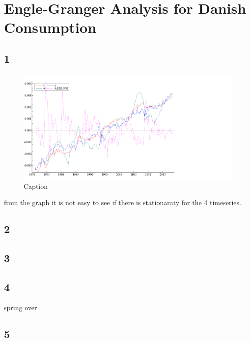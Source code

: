 \documentclass[12pt]{article}
\begin{document}
{\selectfont


\section{Engle-Granger Analysis for Danish Consumption}


\subsection{1}


\begin{figure}[h!]
    \centering
    \includegraphics[scale=0.4]{Figure/fig1.png}
    \caption{Caption}
    \label{fig:my_label}
\end{figure}

from the graph it is not easy to see if there is stationaraty for the 4 timeseries.

\subsection{2}

\subsection{3}

\subsection{4}

spring over

\subsection{5}





}
\end{document}
